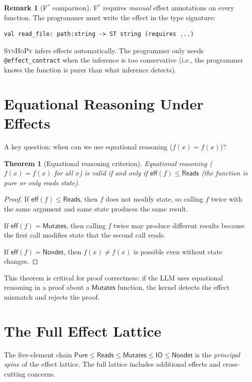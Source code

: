 \documentclass[11pt,a4paper]{report}
\theoremstyle{definition}
\newtheorem{remark}[definition]{Remark}
\theoremstyle{plain}
\newtheorem{theorem}[definition]{Theorem}
\newcommand{\Pure}{\mathsf{Pure}}
\newcommand{\Reads}{\mathsf{Reads}}
\newcommand{\Mutates}{\mathsf{Mutates}}
\newcommand{\IO}{\mathsf{IO}}
\newcommand{\Nondet}{\mathsf{Nondet}}
\newcommand{\fstar}{F$^{*}$}
\newcommand{\synhopy}{\textsc{SynHoPy}}
\begin{document}
\begin{remark}[\fstar{} comparison]
\fstar{} requires \emph{manual} effect annotations on every function.
The programmer must write the effect in the type signature:
\begin{lstlisting}[style=fstar]
val read_file: path:string -> ST string (requires ...)
\end{lstlisting}
\synhopy{} infers effects automatically.  The programmer only needs
\lstinline[style=synhopy]{@effect_contract} when the inference is too
conservative (i.e., the programmer knows the function is purer than what
inference detects).
\end{remark}


\section{Equational Reasoning Under Effects}

A key question: when can we use equational reasoning ($f(x) = f(x)$)?

\begin{theorem}[Equational reasoning criterion]
\label{thm:equational}
Equational reasoning ($f(x) = f(x)$ for all $x$) is valid if and only if
$\mathsf{eff}(f) \leq \Reads$ (the function is pure or only reads state).
\end{theorem}
\begin{proof}
If $\mathsf{eff}(f) \leq \Reads$, then $f$ does not modify state, so calling
$f$ twice with the same argument and same state produces the same result.

If $\mathsf{eff}(f) = \Mutates$, then calling $f$ twice may produce different
results because the first call modifies state that the second call reads.

If $\mathsf{eff}(f) = \Nondet$, then $f(x) \neq f(x)$ is possible even without
state changes.
\end{proof}

This theorem is critical for proof correctness: if the LLM uses equational
reasoning in a proof about a $\Mutates$ function, the kernel detects the
effect mismatch and rejects the proof.


\section{The Full Effect Lattice}

The five-element chain $\Pure \leq \Reads \leq \Mutates \leq \IO \leq \Nondet$
is the \emph{principal spine} of the effect lattice.  The full lattice
includes additional effects and cross-cutting concerns.
\end{document}
